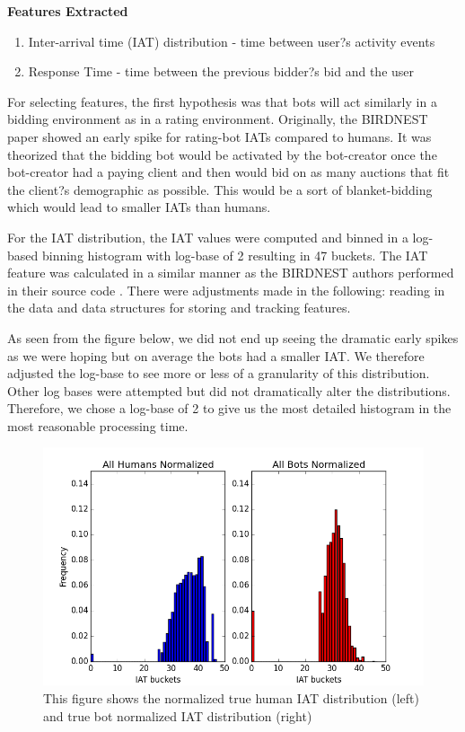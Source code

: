 \documentclass{article} %
\begin{document}
\textbf{Features Extracted} 

\begin{enumerate}
\item Inter-arrival time (IAT) distribution - time between user?s activity events
\item Response Time - time between the previous bidder?s bid and the user
\end{enumerate}

For selecting features, the first hypothesis was that bots will act similarly in a bidding environment as in a rating environment. Originally, the BIRDNEST paper showed an early spike for rating-bot IATs compared to humans. It was theorized that the bidding bot would be activated by the bot-creator once the bot-creator had a paying client and then would bid on as many auctions that fit the client?s demographic as possible. This would be a sort of blanket-bidding which would lead to smaller IATs than humans.

For the IAT distribution, the IAT values were computed and binned in a log-based binning histogram with log-base of 2 resulting in 47 buckets. The IAT feature was calculated in a similar manner as the BIRDNEST authors performed in their source code \cite{birdnest_code}. There were adjustments made in the following: reading in the data and data structures for storing and tracking features.

As seen from the figure below, we did not end up seeing the dramatic early spikes as we were hoping but on average the bots had a smaller IAT. We therefore adjusted the log-base to see more or less of a granularity of this distribution. Other log bases were attempted but did not dramatically alter the distributions. Therefore, we chose a log-base of 2 to give us the most detailed histogram in the most reasonable processing time.

\begin{figure}[h]
\centering
{\caption{This figure shows the normalized true human IAT distribution (left) and true bot normalized IAT distribution (right)} \includegraphics[scale=0.5]{img/bird_iat_dist.png}}
\end{figure}
\end{document}
